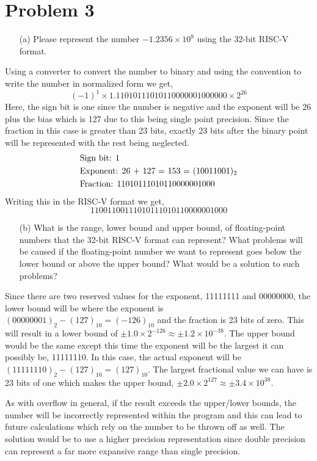 \documentclass[12pt]{article}
\begin{document}
    \section*{Problem 3}
    \begin{itemize}
        \item[(a)] Please represent the number $ -1.2356 \times 10^{8}$ using the 32-bit RISC-V format.
    \end{itemize}
    \par Using a converter to convert the number to binary and using the convention to write the number in normalized form we get,
    \[
        (-1)^{1} \times 1.11010111010110000001000000 \times 2^{26}
    \]
    Here, the sign bit is one since the number is negative and the exponent will be 26 plus the bias which is 127 due to this being single point precision. Since the fraction in this case is greater than 23 bits, exactly 23 bits after the binary point will be represented with the rest being neglected.
    \begin{align*}
        &\text{Sign bit: 1} \\
        &\text{Exponent: 26 + 127 = 153 = $ (10011001)_{2} $} \\
        &\text{Fraction: 11010111010110000001000}
    \end{align*}
    Writing this in the RISC-V format we get,
    \[
        1 10011001 11010111010110000001000
    \]
    \begin{itemize}
        \item[(b)] What is the range, lower bound and upper bound, of floating-point numbers that the 32-bit RISC-V format can represent? What problems will be caused if the floating-point number we want to represent goes below the lower bound or above the upper bound? What would be a solution to such problems?
    \end{itemize}
    \par Since there are two reserved values for the exponent, 11111111 and 00000000, the lower bound will be where the exponent is $ (00000001)_{2} - (127)_{10} = (-126)_{10} $ and the fraction is 23 bits of zero. This will result in a lower bound of $ \pm 1.0 \times 2^{-126} \approx \pm 1.2 \times 10^{-38} $. The upper bound would be the same except this time the exponent will be the largest it can possibly be, 11111110. In this case, the actual exponent will be $ (11111110)_{2} - (127)_{10} = (127)_{10} $. The largest fractional value we can have is 23 bits of one which makes the upper bound, $ \pm 2.0 \times 2^{127} \approx \pm 3.4 \times 10^{38}$.
    \par As with overflow in general, if the result exceeds the upper/lower bounds, the number will be incorrectly represented within the program and this can lead to future calculations which rely on the number to be thrown off as well. The solution would be to use a higher precision representation since double precision can represent a far more expansive range than single precision.
\end{document}
